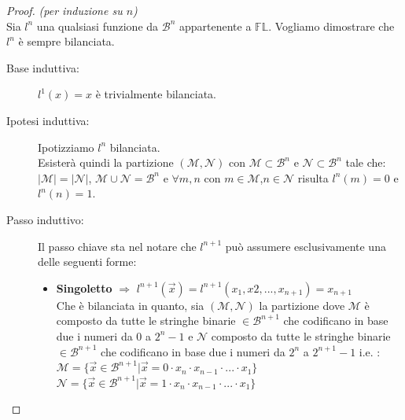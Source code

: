\documentclass[12pt,a4paper,openright]{report}
\begin{document}
\begin{proof} \textit{(per induzione su $n$)\\}
    Sia $l^n$ una qualsiasi funzione da $\mathcal{B}^n$ appartenente a $\mathbb{FL}$.  Vogliamo dimostrare che $l^n$ è sempre bilanciata.\\
    \begin{description}
        \item[Base induttiva:] $l^1(x)=x$ è trivialmente bilanciata.
        \item[Ipotesi induttiva:] Ipotizziamo $l^n$ bilanciata.\\
                                      Esisterà quindi la partizione $(\mathcal{M},\mathcal{N})$ con $\mathcal{M}\subset\mathcal{B}^n$ e $\mathcal{N}\subset\mathcal{B}^n$ tale che:\\
                                      ${\left\vert{\mathcal{M}}\right\vert} = {\left\vert{\mathcal{N}}\right\vert}$, $\mathcal{M} \cup \mathcal{N} = \mathcal{B}^n$ e $\forall m,n$ con
                                      $m\in\mathcal{M}$,$n \in\mathcal{N}$ risulta $l^n(m) = 0$ e $ l^n(n) = 1$.
        \item[Passo induttivo:] Il passo chiave sta nel notare che $l^{n+1}$ può assumere esclusivamente una delle seguenti forme:
                                \begin{itemize}
                                    \item \textbf{Singoletto} $\Rightarrow$ $l^{n+1}(\vec{x}) = l^{n+1}(x_1,x2,...,x_{n+1})=x_{n+1}$\\
                                                              Che è bilanciata in quanto, sia $(\mathcal{M},\mathcal{N})$ la partizione dove $\mathcal{M}$ è composto da tutte le stringhe
                                                              binarie $\in \mathcal{B}^{n+1}$ che codificano in base due i numeri da $0$ a $2^n - 1$ e $\mathcal{N}$ composto da tutte le stringhe binarie
                                                              $\in \mathcal{B}^{n+1}$ che codificano in base due i numeri da $2^n$ a $2^{n+1} - 1$ i.e. :\\
                                                              $\mathcal{M}= \{\vec x \in \mathcal{B}^{n+1} | \vec x = 0\cdot x_n \cdot x_{n-1}\cdot ...\cdot x_1\}$\\
                                                              $\mathcal{N}= \{\vec x \in \mathcal{B}^{n+1} | \vec x = 1\cdot x_n \cdot x_{n-1}\cdot ...\cdot x_1\}$\\

\end{itemize}
\end{description}
\end{proof}
\end{document}
